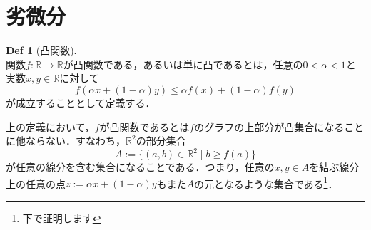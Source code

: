 \documentclass{jsarticle}
\theoremstyle{definition}
\theoremstyle{mystyle} %
\newtheorem*{Def}{Def}
\begin{document}
\large
\section*{劣微分}
\begin{Def}[凸関数]\mbox{}\\
関数$f:\mathbb{R}\to\mathbb{R}$が凸関数である，あるいは単に凸であるとは，任意の$0<\alpha<1$と実数$x,y\in \mathbb{R}$に対して
$$f(\alpha x+(1-\alpha)y)\leq \alpha f(x)+(1-\alpha)f(y)$$
が成立することとして定義する．
\end{Def}
上の定義において，$f$が凸関数であるとは$f$のグラフの上部分が凸集合になることに他ならない．すなわち，$\mathbb{R}^2$の部分集合
$$A:=\{(a,b)\in\mathbb{R}^2\mid b\geq f(a)\}$$
が任意の線分を含む集合になることである．つまり，任意の$x,y\in A$を結ぶ線分上の任意の点$z:=\alpha x+(1-\alpha)y$もまた$A$の元となるような集合である\footnote{下で証明します}．\\
\end{document}

